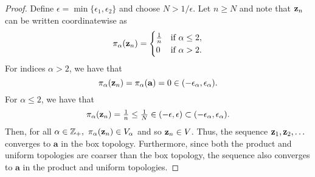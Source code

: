 \begin{solution}
\begin{proof}
        Define $\epsilon = \min\{\epsilon_1, \epsilon_2\}$ and choose $N > 1 / \epsilon$.
        Let $n \geq N$ and note that $\mathbf{z}_n$ can be written coordinatewise as
        \begin{equation*}
            \pi_\alpha(\mathbf{z}_n) = \begin{cases}
                \tfrac{1}{n}    & \text{if } \alpha \leq 2, \\
                0               & \text{if } \alpha > 2.
            \end{cases}
        \end{equation*}
        For indices $\alpha > 2$, we have that
        \begin{equation*}
            \pi_\alpha(\mathbf{z}_n) = \pi_\alpha(\mathbf{a}) = 0 \in (-\epsilon_\alpha, \epsilon_\alpha).
        \end{equation*}
        For $\alpha \leq 2$, we have that
        \begin{equation*}
            \pi_\alpha(\mathbf{z}_n) = \tfrac{1}{n} \leq \tfrac{1}{N} \in (-\epsilon, \epsilon) \subset (-\epsilon_\alpha, \epsilon_\alpha).
        \end{equation*}
        Then, for all $\alpha \in \mathbb{Z}_+,~ \pi_\alpha(\mathbf{z}_n) \in V_\alpha$ and so $\mathbf{z}_n \in V$.
        Thus, the sequence $\mathbf{z}_1, \mathbf{z}_2, \ldots$ converges to $\mathbf{a}$ in the box topology.
        Furthermore, since both the product and uniform topologies are coarser than the box topology, the sequence also converges to $\mathbf{a}$ in the product and uniform topologies.
    \end{proof}
\end{solution}
\newpage

